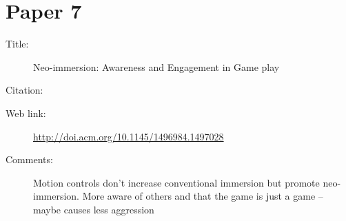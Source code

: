 \documentclass{scrartcl}
\begin{document}
\section*{Paper 7}
\begin{description}
	\item[Title:] Neo-immersion: Awareness and Engagement in Game play
	\item[Citation:] \cite{Whitson}
	\item[Web link:] \url{http://doi.acm.org/10.1145/1496984.1497028}
	\item[Comments:] Motion controls don't increase conventional immersion but promote neo-immersion. More aware of others and that the game is just a game -- maybe causes less aggression
\end{description}





\end{document}
